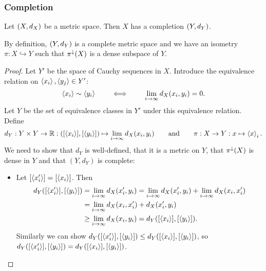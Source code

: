 \subsubsection{Completion}

\begin{proposition} \label{existenceMetricCompletion}
Let $\sSet{X,d_X}$ be a metric space. Then $X$ has a completion $\sSet{Y,d_Y}$.
\end{proposition}
By definition, $\sSet{Y,d_Y}$ is a complete metric space and we have an isometry $\pi:X\hookrightarrow Y$ such that $\pi^\downarrow(X)$ is a dense subspace of $Y$.
\begin{proof}
Let $Y'$ be the space of Cauchy sequences in $X$. Introduce the equivalence relation on $\left\langle x_i \right\rangle,\left\langle y_j \right\rangle\in Y'$:
\[ \left\langle x_i \right\rangle \sim \left\langle y_i \right\rangle \qquad \iff\qquad \lim_{i\to\infty} d_X(x_i,y_i) = 0. \]
Let $Y$ be the set of equivalence classes in $Y'$ under this equivalence relation. Define
\[ d_Y: Y\times Y\to \mathbb{R}: ([\left\langle x_i \right\rangle],[\left\langle y_i \right\rangle]) \mapsto \lim_{i\to\infty}d_X(x_i,y_i) \qquad\text{and}\qquad \pi: X\to Y: x\mapsto \left\langle x \right\rangle_i. \]
We need to show that $d_Y$ is well-defined, that it is a metric on $Y$, that $\pi^\downarrow(X)$ is dense in $Y$ and that $(Y,d_Y)$ is complete:
\begin{itemize}
\item Let $[\left\langle x_i' \right\rangle] = [\left\langle x_i \right\rangle]$. Then
\begin{align*}
d_Y([\left\langle x_i' \right\rangle],[\left\langle y_i \right\rangle]) &= \lim_{i\to\infty}d_X(x'_i,y_i) = \lim_{i\to\infty}d_X(x'_i,y_i) + \lim_{i\to\infty}d_X(x_i,x'_i) \\
&= \lim_{i\to\infty}d_X(x_i,x_i')+d_X(x'_i,y_i) \\
&\geq \lim_{i\to\infty}d_X(x_i,y_i) = d_Y([\left\langle x_i \right\rangle],[\left\langle y_i \right\rangle]).
\end{align*}
Similarly we can show $d_Y([\left\langle x_i' \right\rangle],[\left\langle y_i \right\rangle])\leq d_Y([\left\langle x_i \right\rangle],[\left\langle y_i \right\rangle])$, so $d_Y([\left\langle x'_i \right\rangle],[\left\langle y_i \right\rangle]) = d_Y([\left\langle x_i \right\rangle],[\left\langle y_i \right\rangle])$.


\end{itemize}
\end{proof}
